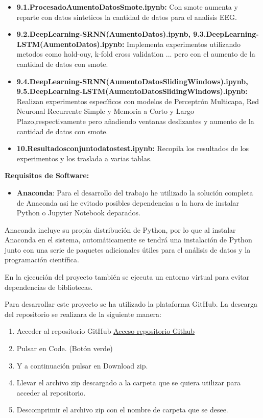 \begin{itemize}
\begin{itemize}
   \item
    \textbf{9.1.ProcesadoAumentoDatosSmote.ipynb:} Con smote aumenta y reparte con datos sinteticos la cantidad de datos para el analisis EEG. 
   \item
    \textbf{9.2.DeepLearning-SRNN(AumentoDatos).ipynb, 9.3.DeepLearning-LSTM(AumentoDatos).ipynb:} Implementa experimentos utilizando metodos como hold-ouy, k-fold cross validation ... pero con el aumento de la cantidad de datos con smote.
   \item
    \textbf{9.4.DeepLearning-SRNN(AumentoDatosSlidingWindows).ipynb, 9.5.DeepLearning-LSTM(AumentoDatosSlidingWindows).ipynb:} Realizan experimentos específicos con modelos de Perceptrón Multicapa, Red Neuronal Recurrente Simple y Memoria a Corto y Largo Plazo,respectivamente pero añadiendo ventanas deslizantes y aumento de la cantidad de datos con smote.
   \item
    \textbf{10.Resultadosconjuntodatostest.ipynb:} Recopila los resultados de los experimentos y los traslada a varias tablas.
   \end{itemize} 
  \end{itemize} 
  
  
\textbf{Requisitos de Software:} 

  \begin{itemize}
   \tightlist
   \item
    \textbf{Anaconda}: Para el desarrollo del trabajo he utilizado la solución completa de Anaconda asi he evitado posibles dependencias a la hora de instalar Python o Jupyter Notebook deparados.
  \end{itemize}
  

Anaconda incluye su propia distribución de Python, por lo que al instalar Anaconda en el sistema, automáticamente se tendrá una instalación de Python junto con una serie de paquetes adicionales útiles para el análisis de datos y la programación científica.

En la ejecución del proyecto también se ejecuta un entorno virtual para evitar dependencias de bibliotecas.


Para desarrollar este proyecto se ha utilizado la plataforma GitHub.
La descarga del repositorio se realizara de la siguiente manera:

\begin{enumerate}
\def\labelenumi{\arabic{enumi}.}
\tightlist
\item Acceder al repositorio GitHub \href{https://github.com/jpg1003/GII_O_MA_23.37}{Acceso repositorio Github}
\item Pulsar en Code. (Botón verde)
\item Y a continuación pulsar en Download zip.


\item Llevar el archivo zip descargado a la carpeta que se quiera utilizar para acceder al repositorio.
\item Descomprimir el archivo zip con el nombre de carpeta que se desee.

\end{enumerate}

